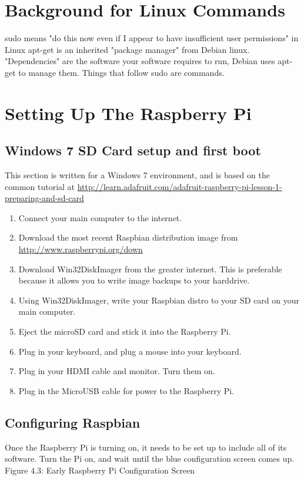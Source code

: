\section{Background for Linux Commands}
sudo means "do this now even if I appear to have insufficient user permissions" in Linux 
apt-get is an inherited "package manager" from Debian linux. "Dependencies" are the software your software requires to run, Debian uses apt-get to manage them.
Things that follow sudo are commands.

\section{Setting Up The Raspberry Pi}
\subsection{Windows 7 SD Card setup and first boot}
This section is written for a Windows 7 environment, and is based on the common tutorial at \url{http://learn.adafruit.com/adafruit-raspberry-pi-lesson-1-preparing-and-sd-card}
\begin{enumerate}
\item Connect your main computer to the internet.
\item Download the most recent Raspbian distribution image from \url{http://www.raspberrypi.org/down}
\item Download Win32DiskImager from the greater internet. This is preferable because it allows you to write image backups to your harddrive.
\item Using Win32DiskImager, write your Raspbian distro to your SD card on your main computer.
\item Eject the microSD card and stick it into the Raspberry Pi.
\item Plug in your keyboard, and plug a mouse into your keyboard.
\item Plug in your HDMI cable and monitor. Turn them on.
\item Plug in the MicroUSB cable for power to the Raspberry Pi.
\end{enumerate}


\subsection{Configuring Raspbian}
Once the Raspberry Pi is turning on, it needs to be set up to include all of its software. Turn the Pi on, and wait until the blue configuration screen comes up.
Figure 4.3: Early Raspberry Pi Configuration Screen

